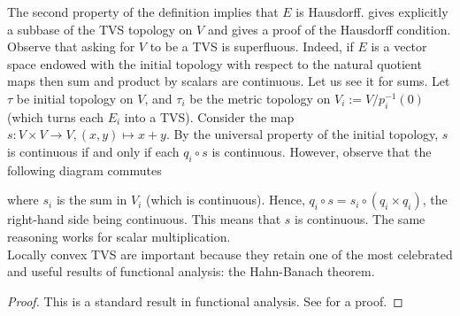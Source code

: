 The second property of the definition implies that \(E\) is Hausdorff. \parencite[Prop. A.10]{Schmeding_2022} gives explicitly a subbase of the TVS topology on \(V\) and gives a proof of the Hausdorff condition. Observe that asking for \(V\) to be a TVS is superfluous. Indeed, if \(E\) is a vector space endowed with the initial topology with respect to the natural quotient maps then sum and product by scalars are continuous. Let us see it for sums. Let \(\tau\) be initial topology on \(V\), and \(\tau_i\) be the metric topology on \(V_i:=V/p_i^{-1}(0)\) (which turns each \(E_i\) into a TVS). Consider the map \(s\colon V \times V \to V, (x,y) \mapsto x+y\). By the universal property of the initial topology, \(s\) is continuous if and only if each \(q_i \circ s\) is continuous. However, observe that the following diagram commutes 
\begin{center}
\end{center}
where \(s_i\) is the sum in \(V_i\) (which is continuous). Hence, \(q_i \circ s=s_i \circ (q_i \times q_i)\), the right-hand side being continuous. This means that \(s\) is continuous. The same reasoning works for scalar multiplication. \\

Locally convex TVS are important because they retain one of the most celebrated and useful results of functional analysis: the Hahn-Banach theorem.



\begin{proof}
    This is a standard result in functional analysis. See \parencite[Prop. 22.12]{meise1997introduction} for a proof.
\end{proof}